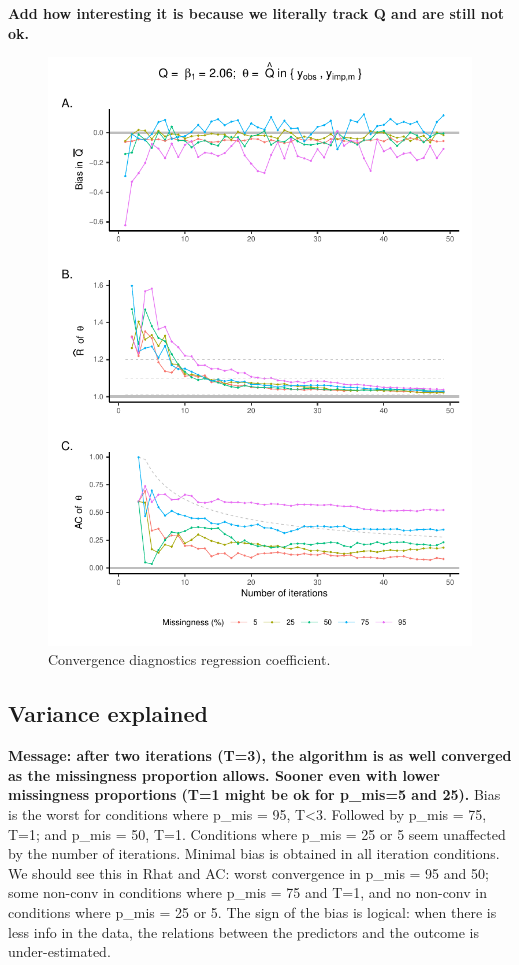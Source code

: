 \documentclass[Royal,times,sageh]{sagej}
\begin{document}
\textbf{Add how interesting it is because we literally track Q and are
still not ok.}

\begin{figure}

{\centering \includegraphics{manuscript_files/figure-latex/est-1} 

}

\caption{Convergence diagnostics regression coefficient.}\label{fig:est}
\end{figure}

\hypertarget{variance-explained}{%
\subsection{Variance explained}\label{variance-explained}}

\textbf{Message: after two iterations (T=3), the algorithm is as well
converged as the missingness proportion allows. Sooner even with lower
missingness proportions (T=1 might be ok for p\_mis=5 and 25).} Bias is
the worst for conditions where p\_mis = 95, T\textless3. Followed by
p\_mis = 75, T=1; and p\_mis = 50, T=1. Conditions where p\_mis = 25 or
5 seem unaffected by the number of iterations. Minimal bias is obtained
in all iteration conditions. We should see this in Rhat and AC: worst
convergence in p\_mis = 95 and 50; some non-conv in conditions where
p\_mis = 75 and T=1, and no non-conv in conditions where p\_mis = 25 or
5. The sign of the bias is logical: when there is less info in the data,
the relations between the predictors and the outcome is under-estimated.
\end{document}
